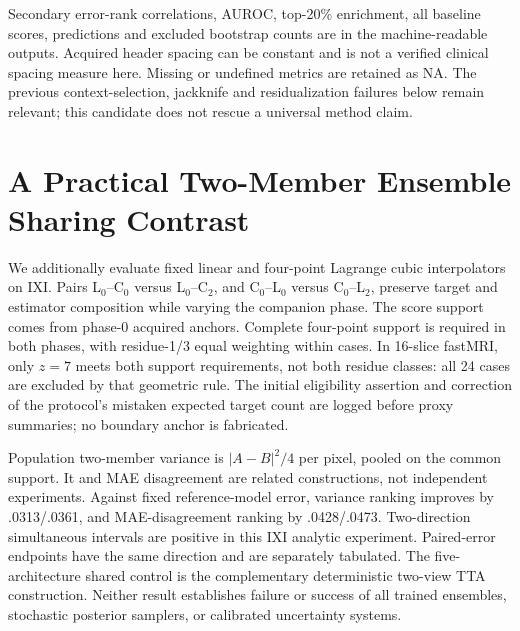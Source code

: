 Secondary error-rank correlations, AUROC, top-20\% enrichment, all baseline scores, predictions and excluded bootstrap counts are in the machine-readable outputs. Acquired header spacing can be constant and is not a verified clinical spacing measure here. Missing or undefined metrics are retained as NA. The previous context-selection, jackknife and residualization failures below remain relevant; this candidate does not rescue a universal method claim.

\section{A Practical Two-Member Ensemble Sharing Contrast}
We additionally evaluate fixed linear and four-point Lagrange cubic interpolators on IXI. Pairs L$_0$--C$_0$ versus L$_0$--C$_2$, and C$_0$--L$_0$ versus C$_0$--L$_2$, preserve target and estimator composition while varying the companion phase. The score support comes from phase-0 acquired anchors. Complete four-point support is required in both phases, with residue-1/3 equal weighting within cases. In 16-slice fastMRI, only $z=7$ meets both support requirements, not both residue classes: all 24 cases are excluded by that geometric rule. The initial eligibility assertion and correction of the protocol's mistaken expected target count are logged before proxy summaries; no boundary anchor is fabricated.



Population two-member variance is $|A-B|^2/4$ per pixel, pooled on the common support. It and MAE disagreement are related constructions, not independent experiments. Against fixed reference-model error, variance ranking improves by .0313/.0361, and MAE-disagreement ranking by .0428/.0473. Two-direction simultaneous intervals are positive in this IXI analytic experiment. Paired-error endpoints have the same direction and are separately tabulated. The five-architecture shared control is the complementary deterministic two-view TTA construction. Neither result establishes failure or success of all trained ensembles, stochastic posterior samplers, or calibrated uncertainty systems.

